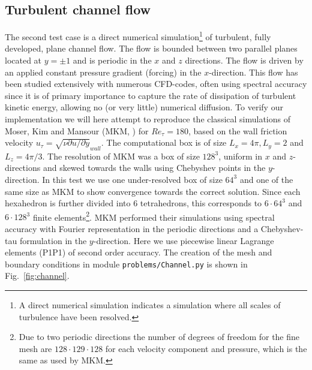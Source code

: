 \documentclass[final,3p,times,twocolumn]{elsarticle}
\newcommand{\inpyth}{\lstinline[style=inlinestyle]} %[]%
\begin{document}
\subsection{Turbulent channel flow}
\label{sec:channel}
The second test case is a direct numerical simulation\footnote{A direct numerical simulation indicates a simulation where all scales of turbulence have been resolved.} of turbulent, fully developed, plane channel flow. The flow is bounded between two parallel planes located at $y = \pm 1$ and is periodic in the $x$ and $z$ directions. The flow is driven by an applied constant pressure gradient (forcing) in the $x$-direction. This flow has been studied extensively with numerous CFD-codes, often using spectral accuracy since it is of primary importance to capture the rate of dissipation of turbulent kinetic energy, allowing no (or very little) numerical diffusion. To verify our implementation we will here attempt to reproduce the classical simulations of Moser, Kim and Mansour (MKM, \cite{mkm99}) for $Re_{\tau} = 180$, based on the wall friction velocity $u_{\tau}=\sqrt{\nu \partial u / \partial y}_{wall}$. The computational box is of size $L_x=4 \pi, L_y = 2$ and $ L_z=4 \pi / 3$. The resolution of MKM was a box of size $128^3$, uniform in $x$ and $z$-directions and skewed towards the walls using Chebyshev points in the $y$-direction. In this test we use one under-resolved box of size $64^3$ and one of the same size as MKM to show convergence towards the correct solution. Since each hexahedron is further divided into 6 tetrahedrons, this corresponds to $6\cdot64^3$ and $6\cdot128^3$ finite elements\footnote{Due to two periodic directions the number of degrees of freedom for the fine mesh are $128\cdot 129 \cdot 128$ for each velocity component and pressure, which is the same as used by MKM.}. MKM performed their simulations using spectral accuracy with Fourier representation in the periodic directions and a Chebyshev-tau formulation in the $y$-direction. Here we use piecewise linear Lagrange elements (P1P1) of second order accuracy. The creation of the mesh and boundary conditions in module \inpyth{problems/Channel.py} is shown in Fig.~\ref{fig:channel}.
\end{document}
